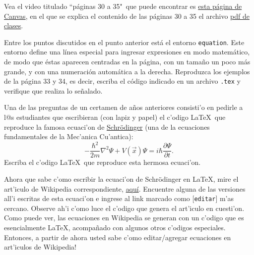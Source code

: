 \documentclass[11pt]{exam}
\begin{document}
\begin{questions}

\item Vea el video titulado ``páginas 30 a 35"\, que puede encontrar es \href{https://udec.instructure.com/courses/17852/pages/expresiones-matematicas-en-latex?module_item_id=653720}{esta página de Canvas}, en el que se explica el contenido de las páginas 30 a 35 el archivo \href{https://udec.instructure.com/courses/17852/files/folder/LaTeX?preview=1217717}{pdf de clases}.

\item Entre los puntos discutidos en el punto anterior está el entorno \texttt{equation}. Este entorno define una línea especial para ingresar expresiones en modo matemático, de modo que éstas aparecen centradas en la página, con un tamaño un poco más grande, y con una numeración automática a la derecha. Reproduzca los ejemplos de la página 33 y 34, es decir, escriba el código indicado en un archivo \texttt{.tex} y verifique que realiza lo señalado.

\item Una de las preguntas de un certamen de a\~nos anteriores consisti'o en pedirle a l@s estudiantes que escribieran (con lapiz y papel) el c'odigo \LaTeX\ que reproduce la famosa ecuaci'on de \href{https://es.wikipedia.org/wiki/Erwin_Schr\%C3\%B6dinger}{Schr\"odinger} (una de la ecuaciones fundamentales de la Mec'anica Cu'antica):
\begin{equation}
-\frac{\hbar^2}{2m}\nabla^2\Psi+V(\vec{x})\Psi=i\hbar\frac{\partial\Psi}{\partial t}.
\end{equation}
Escriba el c'odigo \LaTeX\ que reproduce esta hermosa ecuaci'on.

\item Ahora que sabe c'omo escribir la ecuaci'on de Schr\"odinger en \LaTeX, mire el art'iculo de Wikipedia correspondiente, \href{https://es.wikipedia.org/wiki/Ecuaci\%C3\%B3n_de_Schr\%C3\%B6dinger}{aqu\'i}. Encuentre alguna de las versiones all'i escritas de esta ecuaci'on e ingrese al link marcado como [\texttt{editar}] m'as cercano. Observe ah'i c'omo luce el c'odigo que genera el art'iculo en cuesti'on. Como puede ver, las ecuaciones en Wikipedia se generan con un c'odigo que es esencialmente \LaTeX, acompa\~nado con algunos otros c'odigos especiales. Entonces, a partir de ahora usted sabe c'omo editar/agregar ecuaciones en art'iculos de Wikipedia!


\end{questions}
\end{document}

